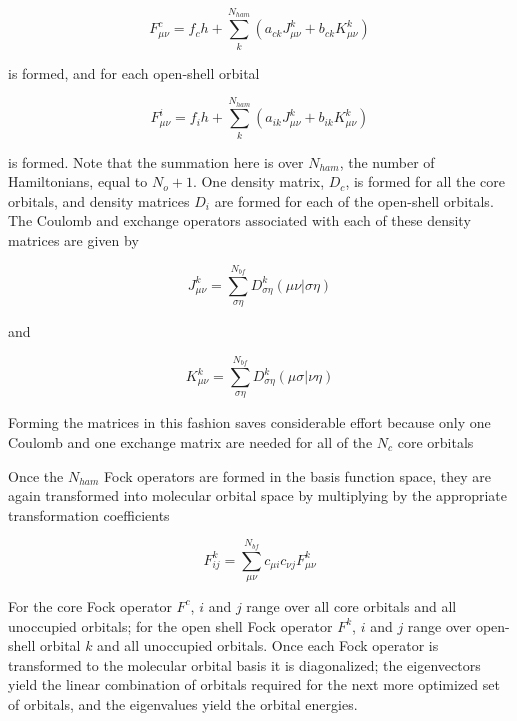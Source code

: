 \begin{equation}
  F_{\mu\nu}^c = f_ch + \sum_k^{N_{ham}}(a_{ck}J_{\mu\nu}^k
	+b_{ck}K_{\mu\nu}^k)
\label{eq:fc}
\end{equation}

\noindent is formed, and for each open-shell orbital 

\begin{equation}
  F_{\mu\nu}^i = f_ih + \sum_k^{N_{ham}}(a_{ik}J_{\mu\nu}^k
	+b_{ik}K_{\mu\nu}^k)
\end{equation}

\noindent is formed. Note that the summation here is over $N_{ham}$,
the number of Hamiltonians, equal to $N_o+1$. One density matrix,
$D_c$, is formed for all the core orbitals, and density matrices $D_i$
are formed for each of the open-shell orbitals. The Coulomb and
exchange operators associated with each of these density matrices are
given by

\begin{equation}
  J_{\mu\nu}^k = \sum_{\sigma\eta}^{N_{bf}}D_{\sigma\eta}^k
	(\mu\nu|\sigma\eta)
\label{eq:jkop}
\end{equation}

\noindent and

\begin{equation}
  K_{\mu\nu}^k = \sum_{\sigma\eta}^{N_{bf}}D_{\sigma\eta}^k
	(\mu\sigma|\nu\eta)
\label{eq:kkop}
\end{equation}

\noindent Forming the matrices in this fashion saves considerable
effort because only one Coulomb and one exchange matrix are needed for
all of the $N_c$ core orbitals 

Once the $N_{ham}$ Fock operators are formed in the basis function
space, they are again transformed into molecular orbital
space by multiplying by the appropriate transformation
coefficients 

\begin{equation}
  F_{ij}^k = \sum_{\mu\nu}^{N_{bf}}c_{\mu i}c_{\nu j}F_{\mu\nu}^k
\label{eq:fij}
\end{equation}

\noindent For the core Fock operator $F^c$, $i$ and $j$ range over all
core orbitals and all unoccupied orbitals; for the open shell Fock
operator $F^k$, $i$ and $j$ range over open-shell orbital $k$ and all
unoccupied orbitals. Once each Fock operator is transformed to the
molecular orbital basis it is diagonalized; the eigenvectors yield the
linear combination of orbitals required for the next more optimized
set of orbitals, and the eigenvalues yield the orbital energies.

